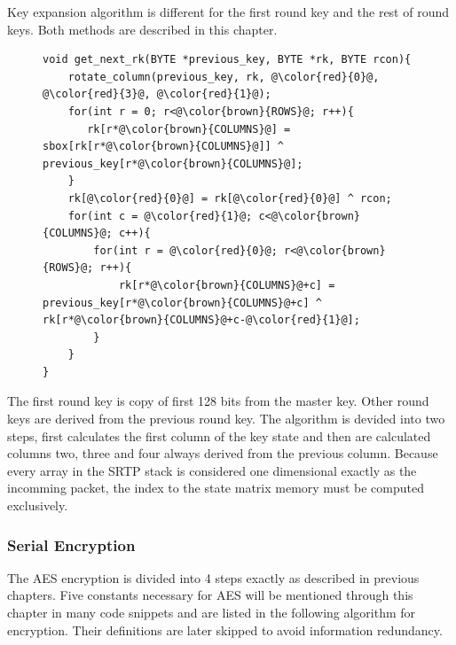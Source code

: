 Key expansion algorithm is different for the first round key and the rest of
round keys. Both methods are described in this chapter. 
\begin{figure}[H]
\begin{lstlisting}
void get_next_rk(BYTE *previous_key, BYTE *rk, BYTE rcon){
    rotate_column(previous_key, rk, @\color{red}{0}@, @\color{red}{3}@, @\color{red}{1}@);
    for(int r = 0; r<@\color{brown}{ROWS}@; r++){
       rk[r*@\color{brown}{COLUMNS}@] = sbox[rk[r*@\color{brown}{COLUMNS}@]] ^ previous_key[r*@\color{brown}{COLUMNS}@]; 
    }
    rk[@\color{red}{0}@] = rk[@\color{red}{0}@] ^ rcon;
    for(int c = @\color{red}{1}@; c<@\color{brown}{COLUMNS}@; c++){
        for(int r = @\color{red}{0}@; r<@\color{brown}{ROWS}@; r++){
            rk[r*@\color{brown}{COLUMNS}@+c] = previous_key[r*@\color{brown}{COLUMNS}@+c] ^ rk[r*@\color{brown}{COLUMNS}@+c-@\color{red}{1}@];
        }
    }
}
\end{lstlisting}
\end{figure}
The first round key is copy of first 128 bits from the master key. 
Other round keys are derived from the previous round key. The algorithm is 
devided into two steps, first calculates the first column of the key state
and then are calculated columns two, three and four always derived from
the previous column. Because every array in the SRTP stack is considered
one dimensional exactly as the incomming packet, the index to the state matrix
memory must be computed exclusively.

\subsubsection*{Serial Encryption}
The AES encryption is divided into 4 steps exactly as described in previous
chapters. Five constants necessary for AES will be mentioned through this 
chapter in many code snippets and are listed in the following algorithm for 
encryption. Their definitions are later skipped to avoid information redundancy.

